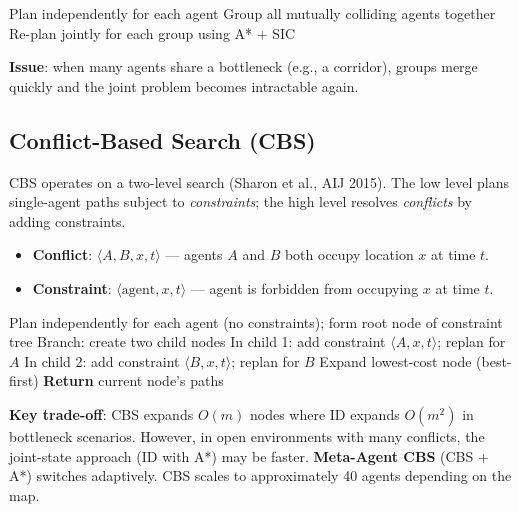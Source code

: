 \documentclass[11pt,a4paper]{article}
\theoremstyle{definition}
\theoremstyle{plain}
\theoremstyle{remark}
\begin{document}
\begin{algorithm}
\caption{Independent Detection}
\begin{algorithmic}
\STATE Plan independently for each agent
    \STATE Group all mutually colliding agents together
    \STATE Re-plan jointly for each group using A* + SIC
\ENDWHILE
\end{algorithmic}
\end{algorithm}

\textbf{Issue}: when many agents share a bottleneck (e.g., a corridor), groups merge quickly and the joint problem becomes intractable again.

\subsection{Conflict-Based Search (CBS)}

CBS operates on a two-level search (Sharon et al., AIJ 2015). The low level plans single-agent paths subject to \emph{constraints}; the high level resolves \emph{conflicts} by adding constraints.

\begin{tcolorbox}[colback=blue!5!white,colframe=blue!75!black,title=\textbf{CBS Definitions}]
\begin{itemize}
    \item \textbf{Conflict}: $\langle A, B, x, t \rangle$ — agents $A$ and $B$ both occupy location $x$ at time $t$.
    \item \textbf{Constraint}: $\langle \text{agent}, x, t \rangle$ — agent is forbidden from occupying $x$ at time $t$.
\end{itemize}
\end{tcolorbox}

\begin{algorithm}
\caption{Conflict-Based Search (CBS)}
\begin{algorithmic}
\STATE Plan independently for each agent (no constraints); form root node of constraint tree
    \STATE Branch: create two child nodes
    \STATE In child 1: add constraint $\langle A, x, t \rangle$; replan for $A$
    \STATE In child 2: add constraint $\langle B, x, t \rangle$; replan for $B$
    \STATE Expand lowest-cost node (best-first)
\ENDWHILE
\STATE \textbf{Return} current node's paths
\end{algorithmic}
\end{algorithm}

\textbf{Key trade-off}: CBS expands $O(m)$ nodes where ID expands $O(m^2)$ in bottleneck scenarios. However, in open environments with many conflicts, the joint-state approach (ID with A*) may be faster. \textbf{Meta-Agent CBS} (CBS + A*) switches adaptively. CBS scales to approximately 40 agents depending on the map.
\end{document}
